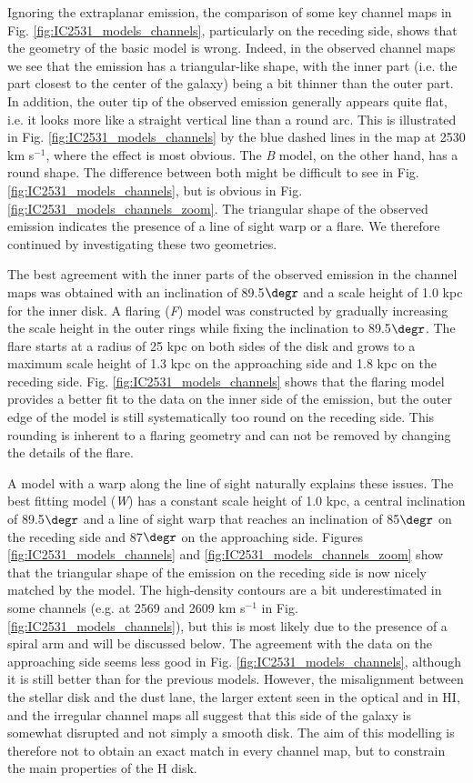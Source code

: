 \documentclass{aa}
\begin{document}
\par
Ignoring the extraplanar emission, the comparison of some key channel maps in Fig. \ref{fig:IC2531_models_channels}, particularly on the receding side, shows that the geometry of the basic model is wrong. Indeed, in the observed channel maps we see that the emission has a triangular-like shape, with the inner part (i.e. the part closest to the center of the galaxy) being a bit thinner than the outer part. In addition, the outer tip of the observed emission generally appears quite flat, i.e. it looks more like a straight vertical line than a round arc. This is illustrated in Fig. \ref{fig:IC2531_models_channels} by the blue dashed lines in the map at 2530 km s$^{-1}$, where the effect is most obvious. The \textit{B} model, on the other hand, has a round shape. The difference between both might be difficult to see in Fig. \ref{fig:IC2531_models_channels}, but is obvious in Fig. \ref{fig:IC2531_models_channels_zoom}. The triangular shape of the observed emission indicates the presence of a line of sight warp or a flare. We therefore continued by investigating these two geometries.
\par
The best agreement with the inner parts of the observed emission in the channel maps was obtained with an inclination of 89.5$\degr$ and a scale height of 1.0 kpc for the inner disk. A flaring (\emph{F}) model was constructed by gradually increasing the scale height in the outer rings while fixing the inclination to 89.5$\degr$. The flare starts at a radius of 25 kpc on both sides of the disk and grows to a maximum scale height of 1.3 kpc on the approaching side and 1.8 kpc on the receding side. Fig. \ref{fig:IC2531_models_channels} shows that the flaring model provides a better fit to the data on the inner side of the emission, but the outer edge of the model is still systematically too round on the receding side. This rounding is inherent to a flaring geometry and can not be removed by changing the details of the flare.
\par
A model with a warp along the line of sight naturally explains these issues. The best fitting model (\emph{W}) has a constant scale height of 1.0 kpc, a central inclination of 89.5$\degr$ and a line of sight warp that reaches an inclination of 85$\degr$ on the receding side and 87$\degr$ on the approaching side. Figures \ref{fig:IC2531_models_channels} and \ref{fig:IC2531_models_channels_zoom} show that the triangular shape of the emission on the receding side is now nicely matched by the model. The high-density contours are a bit underestimated in some channels (e.g. at 2569 and 2609 km s$^{-1}$ in Fig. \ref{fig:IC2531_models_channels}), but this is most likely due to the presence of a spiral arm and will be discussed below. The agreement with the data on the approaching side seems less good in Fig. \ref{fig:IC2531_models_channels}, although it is still better than for the previous models. However, the misalignment between the stellar disk and the dust lane, the larger extent seen in the optical and in HI, and the irregular channel maps all suggest that this side of the galaxy is somewhat disrupted and not simply a smooth disk. The aim of this modelling is therefore not to obtain an exact match in every channel map, but to constrain the main properties of the H{} disk.
\end{document}
